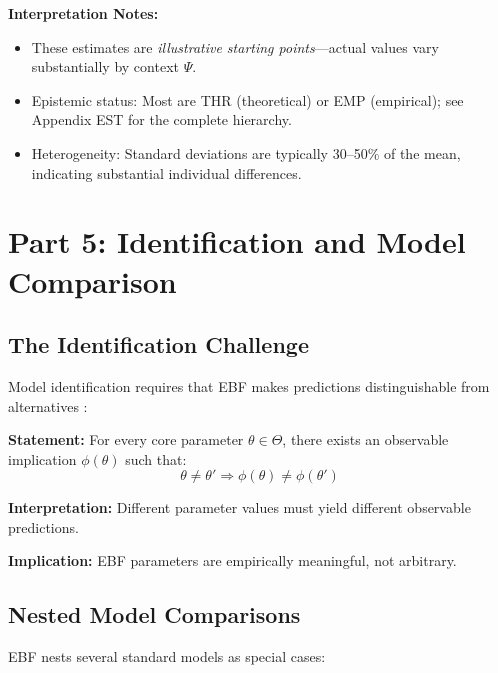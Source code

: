 \textbf{Interpretation Notes:}
\begin{itemize}[nosep]
\item These estimates are \textit{illustrative starting points}---actual values
vary substantially by context $\Psi$.
\item Epistemic status: Most are THR (theoretical) or EMP (empirical); see
Appendix EST for the complete hierarchy.
\item Heterogeneity: Standard deviations are typically 30--50\% of the mean,
indicating substantial individual differences.
\end{itemize}


\section{Part 5: Identification and Model Comparison}
\label{sec:az-identification}

\subsection{The Identification Challenge}

Model identification requires that EBF makes predictions distinguishable
from alternatives \citep{manski1995identification}:

\begin{tcolorbox}[colback=gray!5!white, colframe=gray!75!black,
    title=Axiom AZ-I1: Falsifiability Requirement]
\textbf{Statement:} For every core parameter $\theta \in \Theta$, there exists
an observable implication $\phi(\theta)$ such that:
\begin{equation}
\theta \neq \theta' \Rightarrow \phi(\theta) \neq \phi(\theta')
\end{equation}

\textbf{Interpretation:} Different parameter values must yield different observable predictions.

\textbf{Implication:} EBF parameters are empirically meaningful, not arbitrary.
\end{tcolorbox}

\subsection{Nested Model Comparisons}

EBF nests several standard models as special cases:

